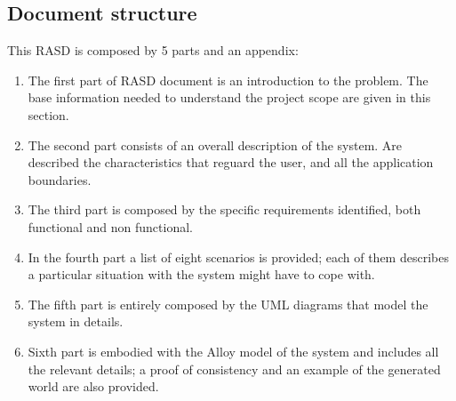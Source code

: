 \subsection{Document structure}
This RASD is composed by 5 parts and an appendix:
\begin{enumerate}
	\item The first part of RASD document is an introduction to the problem. The base information needed to understand the project scope are given in this section.
	\item The second part consists of an overall description of the system. Are described the characteristics that reguard the user, and all the application boundaries.
	\item The third part is composed by the specific requirements identified, both functional and non
	functional.
	\item In the fourth part a list of eight scenarios is provided; each of them describes a particular
	situation with the system might have to cope with.
	\item The fifth part is entirely composed by the UML diagrams that model the system in details.
	\item Sixth part is embodied with the Alloy model of the system and includes all the relevant
	details; a proof of consistency and an example of the generated world are also provided.
\end{enumerate}